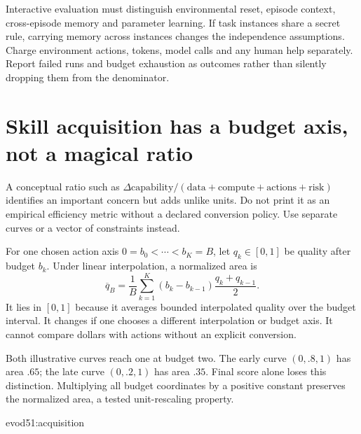 Interactive evaluation must distinguish environmental reset, episode context,
cross-episode memory and parameter learning. If task instances share a secret
rule, carrying memory across instances changes the independence assumptions.
Charge environment actions, tokens, model calls and any human help separately.
Report failed runs and budget exhaustion as outcomes rather than silently
dropping them from the denominator.

\section{Skill acquisition has a budget axis, not a magical ratio}
A conceptual ratio such as $\Delta\text{capability}/(\text{data}+\text{compute}
+\text{actions}+\text{risk})$ identifies an important concern but adds unlike
units. Do not print it as an empirical efficiency metric without a declared
conversion policy. Use separate curves or a vector of constraints instead.

For one chosen action axis $0=b_0<\cdots<b_K=B$, let $q_k\in[0,1]$ be
quality after budget $b_k$. Under linear interpolation, a normalized area is
\begin{equation}\label{evod51:area}
\overline q_B=\frac1B\sum_{k=1}^K
(b_k-b_{k-1})\frac{q_k+q_{k-1}}2.
\end{equation}
It lies in $[0,1]$ because it averages bounded interpolated quality over the
budget interval. It changes if one chooses a different interpolation or budget
axis. It cannot compare dollars with actions without an explicit conversion.
\begin{center}\end{center}
Both illustrative curves reach one at budget two. The early curve $(0,.8,1)$
has area $.65$; the late curve $(0,.2,1)$ has area $.35$. Final score alone
loses this distinction. Multiplying all budget coordinates by a positive constant
preserves the normalized area, a tested unit-rescaling property.

{evod51:acquisition}

